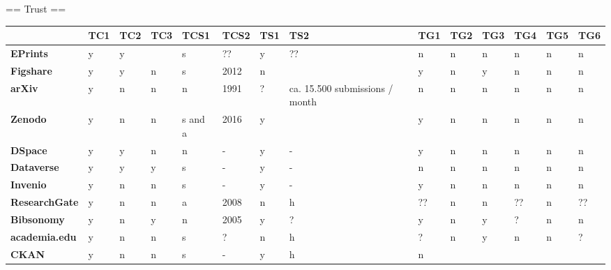 == Trust ==

\begin{tabular}{|m{2.1cm}|m{0.8cm}|m{0.8cm}|m{0.8cm}|m{0.8cm}|m{0.8cm}|m{0.8cm}|m{0.8cm}|m{0.8cm}|m{0.8cm}|m{0.8cm}|m{0.8cm}|m{0.8cm}|m{0.8cm}|} \hline 
 & \textbf{TC1}  & \textbf{TC2}  & \textbf{TC3}  & \textbf{TCS1}  & \textbf{TCS2}  & \textbf{TS1}  & \textbf{TS2}  & \textbf{TG1}  & \textbf{TG2}  & \textbf{TG3}  & \textbf{TG4}  & \textbf{TG5}  & \textbf{TG6}  \\ \hline \textbf{EPrints}  &y &y & &s &?? &y &?? &n &n &n &n &n &n \\ \hline 
\textbf{Figshare}  &y &y &n &s &2012 &n & &y &n &y &n &n &n \\ \hline 
\textbf{arXiv}  &y &n &n &n &1991 &? &ca. 15.500 submissions / month &n &n &n &n &n &n \\ \hline 
\textbf{Zenodo}  &y &n &n &s and a &2016 &y & &y &n &n &n &n &n \\ \hline 
\textbf{DSpace}  &y &y &n &n &- &y &- &y &n &n &n &n &n \\ \hline 
\textbf{Dataverse}  &y &y &y &s &- &y &- &n &n &n &n &n &n \\ \hline 
\textbf{Invenio}  &y &n &n &s &- &y &- &y &n &n &n &n &n \\ \hline 
\textbf{ResearchGate}  &y &n &n &a &2008 &n &h &?? &n &n &?? &n &?? \\ \hline 
\textbf{Bibsonomy}  &y &n &y &n &2005 &y &? &y &n &y &? &n &n \\ \hline 
\textbf{academia.edu}  &y &n &n &s &? &n &h &? &n &y &n &n &? \\ \hline 
\textbf{CKAN}  &y &n &n &s &- &y &h &n & & & & & \\ \hline 
 \end{tabular}


